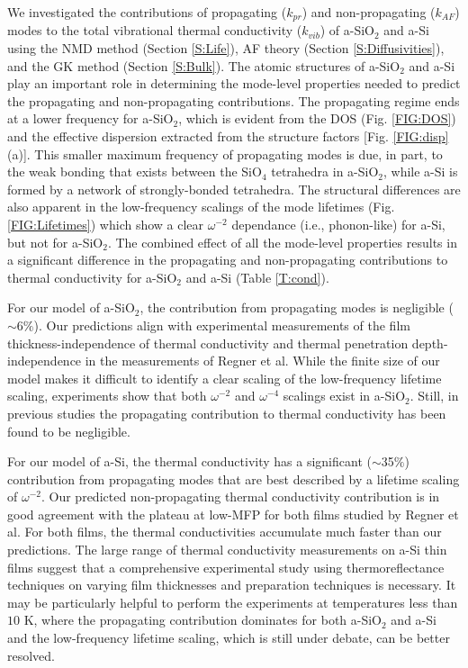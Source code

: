 \documentclass[aps,prb,onecolumn,preprint,superscriptaddress,footinbib,amsmath,amssymb,floatfix]{revtex4}
\begin{document}
We investigated the contributions of propagating ($k_{pr}$) 
and non-propagating ($k_{AF}$) modes to the total vibrational 
thermal conductivity ($k_{vib}$) of 
a-SiO$_2$ and a-Si using the NMD method (Section \ref{S:Life}),  
AF theory (Section \ref{S:Diffusivities}), and 
the GK method (Section \ref{S:Bulk}). 
The atomic structures of a-SiO$_2$ and a-Si play an important role 
in determining the mode-level properties needed to predict the 
propagating and non-propagating contributions. The 
propagating regime ends at a lower frequency for a-SiO$_2$, which is 
evident from the DOS (Fig. \ref{FIG:DOS}) 
and the effective dispersion extracted from the structure factors 
[Fig. \ref{FIG:disp}(a)]. This smaller maximum frequency of 
propagating modes is due, in part, 
to the weak bonding that exists between the SiO$_4$ 
tetrahedra in a-SiO$_2$, 
while a-Si is formed by a network 
of strongly-bonded tetrahedra. 
The structural differences are also 
apparent in the low-frequency scalings of the mode lifetimes (Fig. 
\ref{FIG:Lifetimes}) which show a clear $\omega^{-2}$ dependance 
(i.e., phonon-like) 
for a-Si, but not for a-SiO$_2$. The combined effect of all the 
mode-level properties results in a significant difference 
in the propagating and non-propagating contributions 
to thermal conductivity for a-SiO$_2$ and a-Si (Table \ref{T:cond}). 

For our model of a-SiO$_2$, the contribution from propagating modes 
is negligible ($\sim$6$\%$). 
Our predictions align with experimental measurements of the film 
thickness-independence of thermal conductivity 
\cite{lee_heat_1997,yamane_measurement_2002} 
and thermal penetration depth-independence in the measurements  
of Regner et al.\cite{regner_broadband_2013}
While the finite size 
of our model makes it difficult to identify a clear scaling 
of the low-frequency lifetime scaling, experiments show that 
both $\omega^{-2}$ and $\omega^{-4}$ scalings exist in 
a-SiO$_2$.\cite{masciovecchio_evidence_2006,baldi_sound_2010,
baldi_emergence_2013} Still, in previous studies the propagating 
contribution to thermal conductivity has been found to be 
negligible.\cite{love_estimate_1990,lee_heat_1997,
yamane_measurement_2002}

For our model of a-Si, 
the thermal conductivity has a significant ($\sim$35$\%$) 
contribution from propagating modes that are best 
described by a lifetime scaling of $\omega^{-2}$. Our predicted 
non-propagating thermal conductivity contribution is in good 
agreement with the plateau at low-MFP for both films studied by 
Regner et al. For both films, the thermal conductivities accumulate 
much faster than our predictions. The large range of thermal 
conductivity measurements on a-Si thin films suggest that a 
comprehensive experimental study using thermoreflectance 
techniques on varying film thicknesses and preparation 
techniques is necessary.  
It may be particularly helpful to perform the experiments 
at temperatures less than $10$ K, where the propagating contribution 
dominates for both a-SiO$_2$ and a-Si and the low-frequency 
lifetime scaling, which is still under debate, can be better resolved. 
\end{document}
